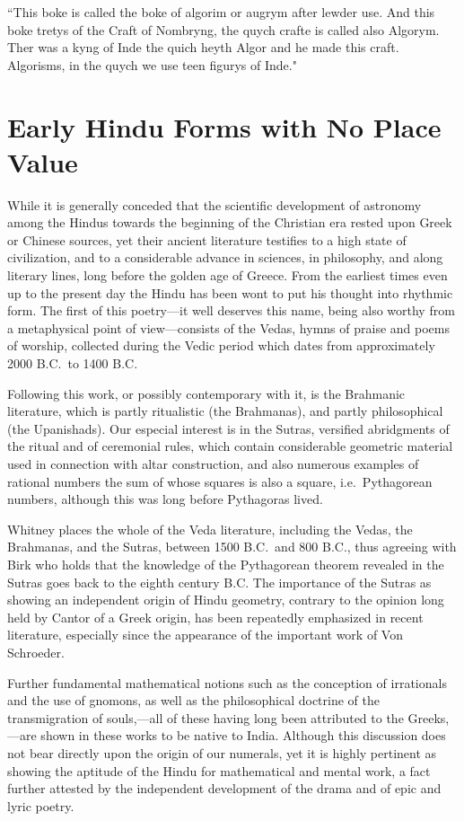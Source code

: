 \documentclass[11pt,a4paper]{article}
\begin{document}
``This boke is called the boke of algorim or augrym after lewder use. And this boke tretys of the Craft of Nombryng, the quych crafte is called also Algorym. Ther was a kyng of Inde the quich heyth Algor and he made this craft. Algorisms, in the quych we use teen figurys of Inde."

\newpage

\section{Early Hindu Forms with No Place Value}

While it is generally conceded that the scientific development of astronomy among the Hindus towards the beginning of the Christian era rested upon Greek or Chinese sources, yet their ancient literature testifies to a high state of civilization, and to a considerable advance in sciences, in philosophy, and along literary lines, long before the golden age of Greece. From the earliest times even up to the present day the Hindu has been wont to put his thought into rhythmic form. The first of this poetry---it well deserves this name, being also worthy from a metaphysical point of view---consists of the Vedas, hymns of praise and poems of worship, collected during the Vedic period which dates from approximately 2000 B.C.\ to 1400 B.C.

Following this work, or possibly contemporary with it, is the Brahmanic literature, which is partly ritualistic (the Brahmanas), and partly philosophical (the Upanishads). Our especial interest is in the Sutras, versified abridgments of the ritual and of ceremonial rules, which contain considerable geometric material used in connection with altar construction, and also numerous examples of rational numbers the sum of whose squares is also a square, i.e.\ Pythagorean numbers, although this was long before Pythagoras lived.

Whitney places the whole of the Veda literature, including the Vedas, the Brahmanas, and the Sutras, between 1500 B.C.\ and 800 B.C., thus agreeing with Birk who holds that the knowledge of the Pythagorean theorem revealed in the Sutras goes back to the eighth century B.C. The importance of the Sutras as showing an independent origin of Hindu geometry, contrary to the opinion long held by Cantor of a Greek origin, has been repeatedly emphasized in recent literature, especially since the appearance of the important work of Von Schroeder.

Further fundamental mathematical notions such as the conception of irrationals and the use of gnomons, as well as the philosophical doctrine of the transmigration of souls,---all of these having long been attributed to the Greeks,---are shown in these works to be native to India. Although this discussion does not bear directly upon the origin of our numerals, yet it is highly pertinent as showing the aptitude of the Hindu for mathematical and mental work, a fact further attested by the independent development of the drama and of epic and lyric poetry.
\end{document}
